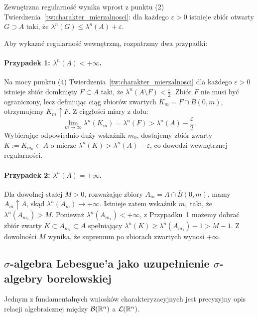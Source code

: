 \begin{dow}
    Zewnętrzna regularność wynika wprost z punktu (2) Twierdzenia~\ref{tw:charakter_mierzalnosci}: dla każdego $\varepsilon > 0$ istnieje zbiór otwarty $G \supset A$ taki, że $\lambda^n(G) \le \lambda^n(A) + \varepsilon$.

    Aby wykazać regularność wewnętrzną, rozpatrzmy dwa przypadki:
    \paragraph{Przypadek 1: $\lambda^n(A) < +\infty$.}
    Na mocy punktu (4) Twierdzenia~\ref{tw:charakter_mierzalnosci} dla każdego $\varepsilon > 0$ istnieje zbiór domknięty $F \subset A$ taki, że $\lambda^n(A \setminus F) < \frac{\varepsilon}{2}$. Zbiór $F$ nie musi być ograniczony, lecz definiując ciąg zbiorów zwartych $K_m = F \cap \overline{B}(0, m)$, otrzymujemy $K_m \uparrow F$. Z ciągłości miary z dołu:
    \begin{equation*}
        \lim_{m \to \infty} \lambda^n(K_m) = \lambda^n(F) > \lambda^n(A) - \frac{\varepsilon}{2}.
    \end{equation*}
    Wybierając odpowiednio duży wskaźnik $m_0$, dostajemy zbiór zwarty $K := K_{m_0} \subset A$ o mierze $\lambda^n(K) > \lambda^n(A) - \varepsilon$, co dowodzi wewnętrznej regularności.

    \paragraph{Przypadek 2: $\lambda^n(A) = +\infty$.}
    Dla dowolnej stałej $M > 0$, rozważając zbiory $A_m = A \cap \overline{B}(0, m)$, mamy $A_m \uparrow A$, skąd $\lambda^n(A_m) \to +\infty$. Istnieje zatem wskaźnik $m_1$ taki, że $\lambda^n(A_{m_1}) > M$. Ponieważ $\lambda^n(A_{m_1}) < +\infty$, z Przypadku~1 możemy dobrać zbiór zwarty $K \subset A_{m_1} \subset A$ spełniający $\lambda^n(K) \ge \lambda^n(A_{m_1}) - 1 > M - 1$. Z dowolności $M$ wynika, że supremum po zbiorach zwartych wynosi $+\infty$.
\end{dow}

\subsection{$\sigma$-algebra Lebesgue'a jako uzupełnienie $\sigma$-algebry borelowskiej}\label{sec:struktura_uzupelnienia}

Jednym z fundamentalnych wniosków charakteryzacyjnych jest precyzyjny opis relacji algebraicznej między $\mathcal{B}({\mathbb{R}^{n}})$ a $\mathcal{L}({\mathbb{R}^{n}})$.

